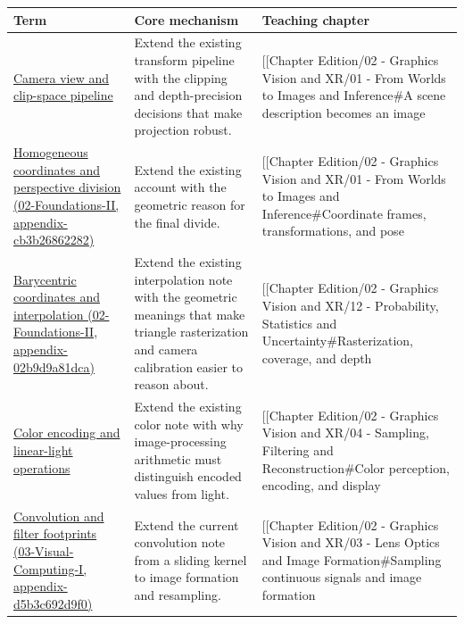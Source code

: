 {\def\LTcaptype{none} %
\begin{longtable}[]{@{}
  >{\raggedright\arraybackslash}p{}
  >{\raggedright\arraybackslash}p{}
  >{\raggedright\arraybackslash}p{}@{}}
\toprule\noalign{}
\begin{minipage}[b]{\linewidth}\raggedright
Term
\end{minipage} & \begin{minipage}[b]{\linewidth}\raggedright
Core mechanism
\end{minipage} & \begin{minipage}[b]{\linewidth}\raggedright
Teaching chapter
\end{minipage} \\
\midrule\noalign{}
\endhead
\bottomrule\noalign{}
\endlastfoot
\hyperref[appendix-1c07d64f5e70]{Camera view and clip-space pipeline} & Extend the existing transform pipeline with the clipping and depth-precision decisions that make projection robust. & {[}{[}Chapter Edition/02 - Graphics Vision and XR/01 - From Worlds to Images and Inference\#A scene description becomes an image \\
\href{../02-Foundations-II/main.pdf\#nameddest=appendix-cb3b26862282}{Homogeneous coordinates and perspective division (02-Foundations-II, appendix-cb3b26862282)} & Extend the existing account with the geometric reason for the final divide. & {[}{[}Chapter Edition/02 - Graphics Vision and XR/01 - From Worlds to Images and Inference\#Coordinate frames, transformations, and pose \\
\href{../02-Foundations-II/main.pdf\#nameddest=appendix-02b9d9a81dca}{Barycentric coordinates and interpolation (02-Foundations-II, appendix-02b9d9a81dca)} & Extend the existing interpolation note with the geometric meanings that make triangle rasterization and camera calibration easier to reason about. & {[}{[}Chapter Edition/02 - Graphics Vision and XR/12 - Probability, Statistics and Uncertainty\#Rasterization, coverage, and depth \\
\hyperref[appendix-a9f83ad40792]{Color encoding and linear-light operations} & Extend the existing color note with why image-processing arithmetic must distinguish encoded values from light. & {[}{[}Chapter Edition/02 - Graphics Vision and XR/04 - Sampling, Filtering and Reconstruction\#Color perception, encoding, and display \\
\href{../03-Visual-Computing-I/main.pdf\#nameddest=appendix-d5b3c692d9f0}{Convolution and filter footprints (03-Visual-Computing-I, appendix-d5b3c692d9f0)} & Extend the current convolution note from a sliding kernel to image formation and resampling. & {[}{[}Chapter Edition/02 - Graphics Vision and XR/03 - Lens Optics and Image Formation\#Sampling continuous signals and image formation \\

\end{longtable}}
